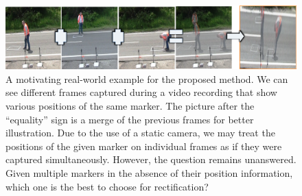 \begin{figure}[t]
  \centerline{\includegraphics[width=\linewidth]{figures/homography/markers_on_the_road.png}}
  \caption[Multiple markers on the road]{A motivating real-world example for the proposed method. We can see different frames captured during a video recording that show various positions of the same marker. The picture after the ``equality'' sign is a merge of the previous frames for better illustration. Due to the use of a static camera, we may treat the positions of the given marker on individual frames as if they were captured simultaneously. However, the question remains unanswered. Given multiple markers in the absence of their position information, which one is the best to choose for rectification?}
  \label{fig:MultipleMarkersOnRoad}
\end{figure}